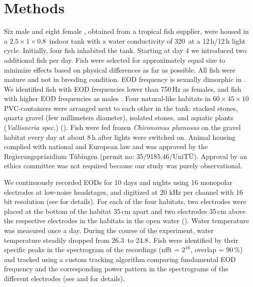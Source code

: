 \section{Methods}
Six male and eight female \lepto{}, obtained from a tropical fish supplier, were housed in a $2.5 \times 1 \times 0.8$\,\cubic\meter{} indoor tank with a water conductivity of 320\,\micro\siemens\per\centi\meter{} at a 12\,h/12\,h light cycle. Initially, four fish inhabited the tank. Starting at day 4 we introduced two additional fish per day. Fish were selected for approximately equal size to minimize effects based on physical differences as far as possible. All fish were mature and not in breeding condition. EOD frequency is sexually dimorphic in \lepto{} \citep{Meyer1987}. We identified fish with EOD frequencies lower than 750\,Hz as females, and fish with higher EOD frequencies as males \citep{Henninger2018}. Four natural-like habitats in $60 \times 45 \times 10$\,\centi\meter\cubed{}  PVC-containers were arranged next to each other in the tank: stacked stones, quartz gravel (few millimeters diameter), isolated stones, and aquatic plants (\textit{Vallisneria spec.}) (). Fish were fed frozen \textit{Chironomus plumosus} on the gravel habitat every day at about 8\,h after lights were switched on. Animal housing complied with national and European law and was approved by the
Regierungspr\"asidium T\"ubingen (permit no: 35/9185.46/UniT\"U). Approval by an ethics committee was not required because our study was purely observational.

We continuously recorded EODs for 10 days and nights using 16 monopolar electrodes at low-noise headstages, and digitized at 20 kHz per channel with 16 bit resolution (see \citealp{Henninger2018} for details). For each of the four habitats, two electrodes were placed at the bottom of the habitat 35\,cm apart and two electrodes 35\,cm above the respective electrodes in the habitats in the open water (). Water temperature was measured once a day. During the course of the experiment, water temperature steadily dropped from 26.3\,\celsius{} to 24.8\,\celsius. Fish were identified by their specific peaks in the spectrogram of the recordings (nfft = $2^{16}$, overlap = 90\,\%) and tracked using a custom tracking algorithm comparing fundamental EOD frequency and the corresponding power pattern in the spectrograms of the different electrodes (see \citealp{Henninger2018} and \citealp{Madhav2018} for details).

